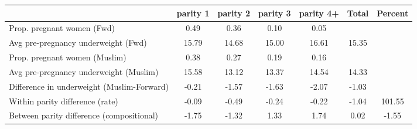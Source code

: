 \begin{tabular}{l*{6}{c}}
\toprule
            &\multicolumn{1}{c}{parity 1}&\multicolumn{1}{c}{parity 2}&\multicolumn{1}{c}{parity 3}&\multicolumn{1}{c}{parity 4+}&\multicolumn{1}{c}{Total}&\multicolumn{1}{c}{Percent}\\
\midrule
\midrule
Prop. pregnant women (Fwd)&        0.49&        0.36&        0.10&        0.05&            &            \\
Avg pre-pregnancy underweight (Fwd)&       15.79&       14.68&       15.00&       16.61&       15.35&            \\
Prop. pregnant women (Muslim)&        0.38&        0.27&        0.19&        0.16&            &            \\
Avg pre-pregnancy underweight (Muslim)&       15.58&       13.12&       13.37&       14.54&       14.33&            \\
Difference in underweight (Muslim-Forward)&       -0.21&       -1.57&       -1.63&       -2.07&       -1.03&            \\
Within parity difference (rate)&       -0.09&       -0.49&       -0.24&       -0.22&       -1.04&      101.55\\
Between parity difference (compositional)&       -1.75&       -1.32&        1.33&        1.74&        0.02&       -1.55\\
\bottomrule
\end{tabular}
